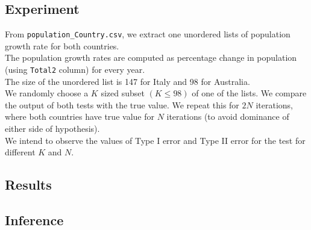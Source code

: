 \documentclass[fleqn, 11pt]{article}
\begin{document}
\subsection{Experiment}
From \verb!population_Country.csv!, we extract one unordered lists of population growth rate for both countries. \\
The population growth rates are computed as percentage change in population (using \verb!Total2! column) for every year. \\
The size of the unordered list is 147 for Italy and 98 for Australia. \\
We randomly choose a $K$ sized subset $(K \le 98)$ of one of the lists. We compare the output of both tests with the true value. We repeat this for $2N$ iterations, where both countries have true value for $N$ iterations (to avoid dominance of either side of hypothesis). \\
We intend to observe the values of Type I error and Type II error for the test for different $K$ and $N$.

\subsection{Results}


\subsection{Inference}
\end{document}
